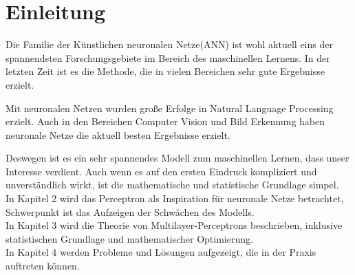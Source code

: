 \section{Einleitung}
Die Familie der Künstlichen neuronalen Netze(ANN) ist wohl aktuell eins der spannendsten Forschungsgebiete im Bereich des maschinellen Lernens. In der letzten Zeit ist es die Methode, die in vielen Bereichen sehr gute Ergebnisse erzielt. 

Mit neuronalen Netzen wurden große Erfolge in Natural Language Processing erzielt. Auch in den Bereichen Computer Vision und Bild Erkennung haben neuronale Netze die aktuell besten Ergebnisse erzielt\cite{LeCun2015}.

Deswegen ist es ein sehr spannendes Modell zum maschinellen Lernen, dass unser Interesse verdient. Auch wenn es auf den ersten Eindruck kompliziert und unverständlich wirkt, ist die mathematische und statistische Grundlage simpel.\\
In Kapitel 2 wird das Perceptron als Inspiration für neuronale Netze betrachtet, Schwerpunkt ist das Aufzeigen der Schwächen des Modells. \\
In Kapitel 3 wird die Theorie von Multilayer-Perceptrons beschrieben, inklusive statistischen Grundlage und mathematischer Optimierung. \\
In Kapitel 4 werden Probleme und Lösungen aufgezeigt, die in der Praxis auftreten können.
